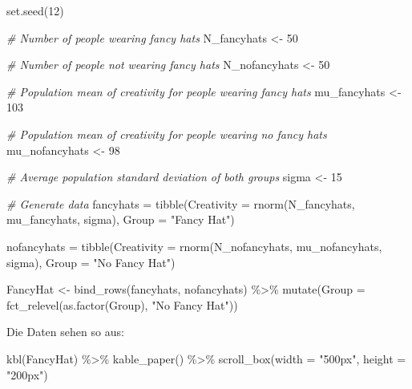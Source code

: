 \documentclass[]{tufte-handout}
\newenvironment{Shaded}{}{}
\newcommand{\AttributeTok}[1]{\textcolor[rgb]{0.49,0.56,0.16}{#1}}
\newcommand{\CommentTok}[1]{\textcolor[rgb]{0.38,0.63,0.69}{\textit{#1}}}
\newcommand{\DecValTok}[1]{\textcolor[rgb]{0.25,0.63,0.44}{#1}}
\newcommand{\FunctionTok}[1]{\textcolor[rgb]{0.02,0.16,0.49}{#1}}
\newcommand{\NormalTok}[1]{#1}
\newcommand{\OtherTok}[1]{\textcolor[rgb]{0.00,0.44,0.13}{#1}}
\newcommand{\SpecialCharTok}[1]{\textcolor[rgb]{0.25,0.44,0.63}{#1}}
\newcommand{\StringTok}[1]{\textcolor[rgb]{0.25,0.44,0.63}{#1}}
\begin{document}
\begin{Shaded}
\begin{Highlighting}[]
\FunctionTok{set.seed}\NormalTok{(}\DecValTok{12}\NormalTok{)}

\CommentTok{\# Number of people wearing fancy hats}
\NormalTok{N\_fancyhats }\OtherTok{\textless{}{-}} \DecValTok{50} 

\CommentTok{\# Number of people not wearing fancy hats}
\NormalTok{N\_nofancyhats }\OtherTok{\textless{}{-}} \DecValTok{50}

\CommentTok{\# Population mean of creativity for people wearing fancy hats}
\NormalTok{mu\_fancyhats }\OtherTok{\textless{}{-}} \DecValTok{103} 

\CommentTok{\# Population mean of creativity for people wearing no fancy hats}
\NormalTok{mu\_nofancyhats }\OtherTok{\textless{}{-}} \DecValTok{98} 

\CommentTok{\# Average population standard deviation of both groups}
\NormalTok{sigma }\OtherTok{\textless{}{-}} \DecValTok{15} 

\CommentTok{\# Generate data}
\NormalTok{fancyhats }\OtherTok{=} \FunctionTok{tibble}\NormalTok{(}\AttributeTok{Creativity =} \FunctionTok{rnorm}\NormalTok{(N\_fancyhats, mu\_fancyhats, sigma),}
               \AttributeTok{Group =} \StringTok{"Fancy Hat"}\NormalTok{)}

\NormalTok{nofancyhats }\OtherTok{=} \FunctionTok{tibble}\NormalTok{(}\AttributeTok{Creativity =} \FunctionTok{rnorm}\NormalTok{(N\_nofancyhats, mu\_nofancyhats, sigma),}
                 \AttributeTok{Group =} \StringTok{"No Fancy Hat"}\NormalTok{)}


\NormalTok{FancyHat }\OtherTok{\textless{}{-}} \FunctionTok{bind\_rows}\NormalTok{(fancyhats, nofancyhats)  }\SpecialCharTok{\%\textgreater{}\%}
    \FunctionTok{mutate}\NormalTok{(}\AttributeTok{Group =} \FunctionTok{fct\_relevel}\NormalTok{(}\FunctionTok{as.factor}\NormalTok{(Group), }\StringTok{"No Fancy Hat"}\NormalTok{))}
\end{Highlighting}
\end{Shaded}

Die Daten sehen so aus:

\begin{Shaded}
\begin{Highlighting}[]
\FunctionTok{kbl}\NormalTok{(FancyHat) }\SpecialCharTok{\%\textgreater{}\%}
  \FunctionTok{kable\_paper}\NormalTok{() }\SpecialCharTok{\%\textgreater{}\%}
  \FunctionTok{scroll\_box}\NormalTok{(}\AttributeTok{width =} \StringTok{"500px"}\NormalTok{, }\AttributeTok{height =} \StringTok{"200px"}\NormalTok{)}
\end{Highlighting}
\end{Shaded}
\end{document}
